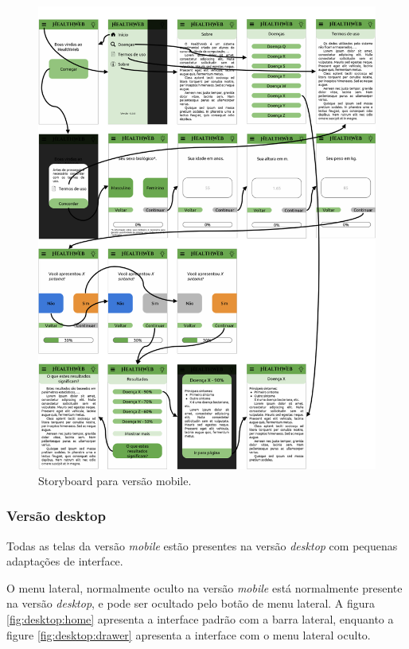 \begin{figure}[htbp]
	\centering
	\includegraphics[width=\linewidth]{figure/prototype/mobile/storyboard.png}
	\caption{Storyboard para versão mobile.}
	\label{fig:mobile:story}
\end{figure}

\subsubsection{Versão desktop}

Todas as telas da versão \textit{mobile} estão presentes na versão \textit{desktop} com pequenas adaptações de interface.

O menu lateral, normalmente oculto na versão \textit{mobile} está normalmente presente na versão \textit{desktop}, e pode ser ocultado pelo botão de menu lateral. A figura \ref{fig:desktop:home} apresenta a interface padrão com a barra lateral, enquanto a figure \ref{fig:desktop:drawer} apresenta a interface com o menu lateral oculto.


